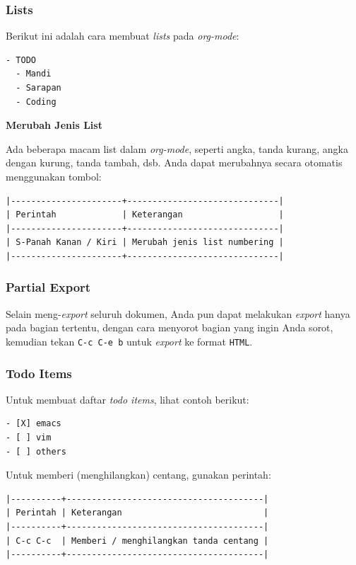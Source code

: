 \documentclass{article}
\begin{document}
\subsubsection{Lists}
Berikut ini adalah cara membuat \emph{lists} pada \emph{org-mode}:

\begin{verbatim}
- TODO
  - Mandi
  - Sarapan
  - Coding
\end{verbatim}

\noindent\textbf{Merubah Jenis List}

Ada beberapa macam list dalam \emph{org-mode}, seperti angka, tanda kurang,
angka dengan kurung, tanda tambah, dsb. Anda dapat merubahnya secara 
otomatis menggunakan tombol:

\begin{verbatim}
|----------------------+------------------------------|
| Perintah             | Keterangan                   |
|----------------------+------------------------------|
| S-Panah Kanan / Kiri | Merubah jenis list numbering |
|----------------------+------------------------------|
\end{verbatim}

\subsubsection{Partial Export}
Selain meng-\emph{export} seluruh dokumen, Anda pun dapat melakukan 
\emph{export} hanya pada bagian tertentu, dengan cara menyorot bagian yang 
ingin Anda sorot, kemudian tekan \verb=C-c C-e b= untuk \emph{export} ke 
format \verb=HTML=.

\subsubsection{Todo Items}
Untuk membuat daftar \emph{todo items}, lihat contoh berikut:

\begin{verbatim}
- [X] emacs
- [ ] vim
- [ ] others
\end{verbatim}

Untuk memberi (menghilangkan) centang, gunakan perintah:

\begin{verbatim}
|----------+---------------------------------------|
| Perintah | Keterangan                            |
|----------+---------------------------------------|
| C-c C-c  | Memberi / menghilangkan tanda centang |
|----------+---------------------------------------|
\end{verbatim}
\end{document}
